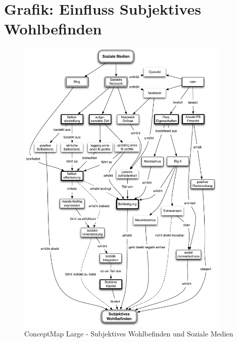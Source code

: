 \section{Grafik: Einfluss Subjektives Wohlbefinden}\label{sec.anhangGrafik}
\begin{figure}[H]
	\centering
		\includegraphics[width=0.9\textwidth]{images/grafiken/conceptMap_Swb_Sm_v2.pdf}
	\caption{ConceptMap Large - Subjektives Wohlbefinden und Soziale Medien}
	\label{fig.ConceptMapSwbSmAnhang}
\end{figure}
